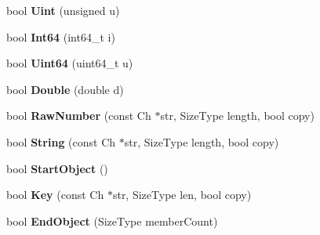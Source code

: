 \begin{DoxyCompactItemize}
\item 
bool {\bfseries Uint} (unsigned u)\hypertarget{class_generic_schema_validator_aa688665c5274f93543c84a4b6cabe8da}{}\label{class_generic_schema_validator_aa688665c5274f93543c84a4b6cabe8da}

\item 
bool {\bfseries Int64} (int64\+\_\+t i)\hypertarget{class_generic_schema_validator_ac5a9e416e18129a7b787f251019a828f}{}\label{class_generic_schema_validator_ac5a9e416e18129a7b787f251019a828f}

\item 
bool {\bfseries Uint64} (uint64\+\_\+t u)\hypertarget{class_generic_schema_validator_abfc56c58cf0b65318e376fc5f2879292}{}\label{class_generic_schema_validator_abfc56c58cf0b65318e376fc5f2879292}

\item 
bool {\bfseries Double} (double d)\hypertarget{class_generic_schema_validator_aed0532dbda3ac6f3ca7196af06066b86}{}\label{class_generic_schema_validator_aed0532dbda3ac6f3ca7196af06066b86}

\item 
bool {\bfseries Raw\+Number} (const Ch $\ast$str, Size\+Type length, bool copy)\hypertarget{class_generic_schema_validator_ae4f024145421d2c1dde08a9de528722a}{}\label{class_generic_schema_validator_ae4f024145421d2c1dde08a9de528722a}

\item 
bool {\bfseries String} (const Ch $\ast$str, Size\+Type length, bool copy)\hypertarget{class_generic_schema_validator_a33cf3f83307a8fea38c3238ef75c3d58}{}\label{class_generic_schema_validator_a33cf3f83307a8fea38c3238ef75c3d58}

\item 
bool {\bfseries Start\+Object} ()\hypertarget{class_generic_schema_validator_a59972d612c3d37aae9a30222e428d216}{}\label{class_generic_schema_validator_a59972d612c3d37aae9a30222e428d216}

\item 
bool {\bfseries Key} (const Ch $\ast$str, Size\+Type len, bool copy)\hypertarget{class_generic_schema_validator_a6d08b458216ec4a09eed9d94800d05c1}{}\label{class_generic_schema_validator_a6d08b458216ec4a09eed9d94800d05c1}

\item 
bool {\bfseries End\+Object} (Size\+Type member\+Count)\hypertarget{class_generic_schema_validator_aa89e14f0f731f6acdec22a0f7e003037}{}\label{class_generic_schema_validator_aa89e14f0f731f6acdec22a0f7e003037}


\end{DoxyCompactItemize}
